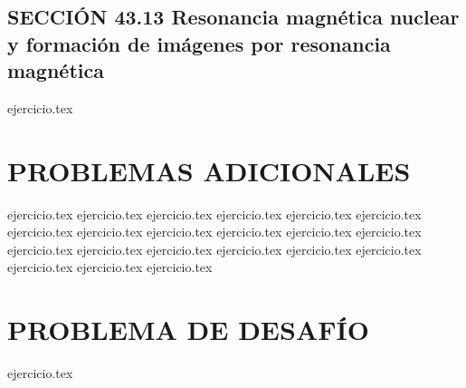 \subsection*{SECCIÓN 43.13 Resonancia magnética nuclear y formación de imágenes por resonancia magnética}
\begin{enumerate}
    \setcounter{enumi}{43}
    {ejercicio.tex}
\end{enumerate}

\section*{PROBLEMAS ADICIONALES}
\begin{enumerate}
    \setcounter{enumi}{44}
    {ejercicio.tex}
    {ejercicio.tex}
    {ejercicio.tex}
    {ejercicio.tex}
    {ejercicio.tex}
    {ejercicio.tex}
    {ejercicio.tex}
    {ejercicio.tex}
    {ejercicio.tex}
    {ejercicio.tex}
    {ejercicio.tex}
    {ejercicio.tex}
    {ejercicio.tex}
    {ejercicio.tex}
    {ejercicio.tex}
    {ejercicio.tex}
    {ejercicio.tex}
    {ejercicio.tex}
    {ejercicio.tex}
    {ejercicio.tex}
    {ejercicio.tex}
\end{enumerate}

\section*{PROBLEMA DE DESAFÍO}
\begin{enumerate}
    \setcounter{enumi}{65}
    {ejercicio.tex}
\end{enumerate}
